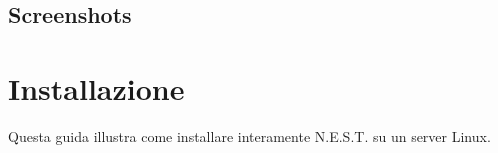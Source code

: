 \documentclass[letterpaper,10pt,italian]{sphinxmanual}
\begin{document}
\section{Screenshots}
\label{\detokenize{guide/about:screenshots}}
\noindent{}

\noindent{}

\noindent{}

\noindent{}

\noindent{}


\chapter{Installazione}
\label{\detokenize{guide/installation:installazione}}\label{\detokenize{guide/installation::doc}}
\sphinxAtStartPar
Questa guida illustra come installare interamente N.E.S.T. su un server Linux.
\end{document}
